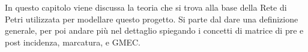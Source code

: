 In questo capitolo viene discussa la teoria che si trova alla base della Rete di Petri utilizzata per modellare questo progetto. Si parte dal dare una definizione generale, per poi andare più nel dettaglio spiegando i concetti di matrice di pre e post incidenza, marcatura, e GMEC.